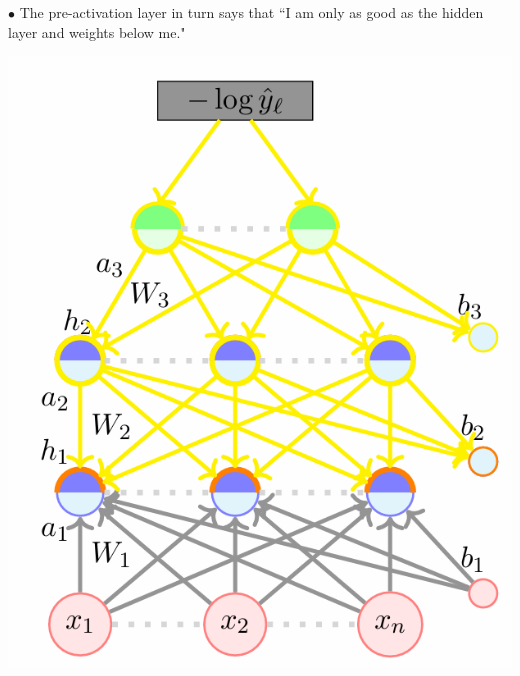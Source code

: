 \documentclass[11pt, a4paper]{article}
\begin{document}
\noindent
\begin{minipage}{0.5\textwidth}
    $\bullet$ The pre-activation layer in turn says that ``I am only as good as the hidden layer and weights below me."
\end{minipage}
\hfill
\begin{minipage}{0.45\textwidth}
    \includegraphics[scale = 0.5]{image_6.png}
\end{minipage}
\end{document}
